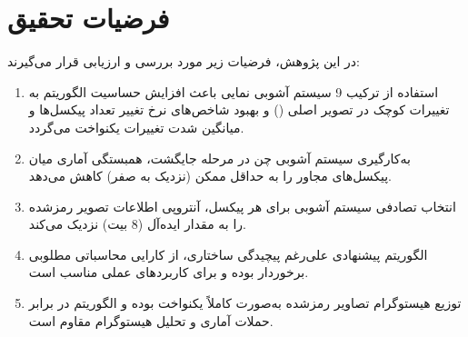 \section{فرضیات تحقیق}
در این پژوهش، فرضیات زیر مورد بررسی و ارزیابی قرار می‌گیرند:
\begin{enumerate}
    \item استفاده از ترکیب 9 سیستم آشوبی نمایی باعث افزایش حساسیت الگوریتم به تغییرات کوچک در تصویر اصلی () و بهبود شاخص‌های نرخ تغییر تعداد پیکسل‌ها\protect{} و میانگین شدت تغییرات یکنواخت\protect{} می‌گردد.
    \item به‌کارگیری سیستم آشوبی چن در مرحله جایگشت، همبستگی آماری میان پیکسل‌های مجاور را به حداقل ممکن (نزدیک به صفر) کاهش می‌دهد.
    \item انتخاب تصادفی سیستم آشوبی برای هر پیکسل، آنتروپی اطلاعات تصویر رمزشده را به مقدار ایده‌آل (8 بیت) نزدیک می‌کند.
    \item الگوریتم پیشنهادی علی‌رغم پیچیدگی ساختاری، از کارایی محاسباتی مطلوبی برخوردار بوده و برای کاربردهای عملی مناسب است.
    \item توزیع هیستوگرام تصاویر رمزشده به‌صورت کاملاً یکنواخت بوده و الگوریتم در برابر حملات آماری و تحلیل هیستوگرام مقاوم است.
\end{enumerate}

